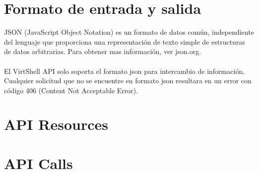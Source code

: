 \section{Formato de entrada y salida}
JSON (JavaScript Object Notation) es un formato de datos común, independiente del lenguaje que proporciona una representación de texto simple de estructuras de datos arbitrarias. Para obtener mas información, ver json.org.\\
\\
El VirtShell API solo soporta el formato json para intercambio de información. Cualquier solicitud que no se encuentre en formato json resultara en un error con código 406 (Content Not Acceptable Error).



\section{API Resources}

















\section{API Calls}


